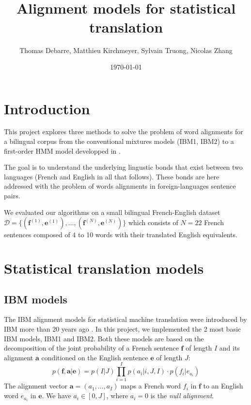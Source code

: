 \documentclass[final]{beamer}
\title
[Probabilistic Graphical Models Poster Session, Wed 4 Jan 2017] %
{ %
Alignment models for statistical translation
}
\author{ %
Thomas Debarre, Matthieu Kirchmeyer, Sylvain Truong, Nicolas Zhang
}
\institute
{\mbox{}
}
\date{\today}
\begin{document}
\begin{frame}[t]
\begin{multicols}{3}

\section{Introduction}

This project explores three methods to solve the problem of word alignments for a bilingual corpus from the conventional mixtures models (IBM1, IBM2) to a first-order HMM model developped in \cite{vogel}. 

The goal is to understand the underlying lingustic bonds that exist between two languages (French and English in all that follows). These bonds are here addressed with the problem of words alignments in foreign-languages sentence pairs.

We evaluated our algorithms on a small bilingual French-English dataset $\mathcal{D} = \{ (\textbf{f}^{(1)},\textbf{e}^{(1)}), \dots , (\textbf{f}^{(N)},\textbf{e}^{(N)})\}$ which consists of $N = 22$ French sentences composed of 4 to 10 words with their translated English equivalents. 

\section{Statistical translation models}

\subsection{IBM models}
The IBM alignment models for statistical machine translation were introduced by IBM more than 20 years ago \cite{brown}. In this project, we implemented the 2 most basic IBM models, IBM1 and IBM2. Both these models are based on the decomposition of the joint probability of a French sentence $\textbf{f}$ of length $I$ and its alignment $\textbf{a}$ conditioned on the English sentence $\textbf{e}$ of length $J$:
\begin{equation*}
p(\textbf{f}, \textbf{a} \vert \textbf{e}) = p(I \vert J) \prod_{i=1}^I p(a_i \vert i, J, I) \cdot p(f_i \vert e_{a_i})
\end{equation*}
The alignment vector $\textbf{a} = (a_1, \hdots, a_I)$ maps a French word $f_i$ in $\textbf{f}$ to an English word $e_{a_i}$ in $\textbf{e}$. We have $a_i \in [0, J]$, where $a_i = 0$ is the \textit{null alignment}.


\end{multicols}
\end{frame}
\end{document}
